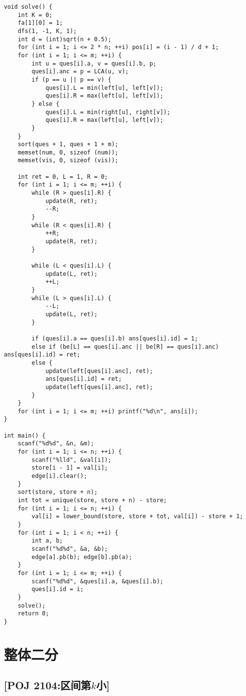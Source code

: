\begin{lstlisting}
void solve() {
    int K = 0;
    fa[1][0] = 1;
    dfs(1, -1, K, 1);
    int d = (int)sqrt(n + 0.5);
    for (int i = 1; i <= 2 * n; ++i) pos[i] = (i - 1) / d + 1;
    for (int i = 1; i <= m; ++i) {
        int u = ques[i].a, v = ques[i].b, p;
        ques[i].anc = p = LCA(u, v);
        if (p == u || p == v) {
            ques[i].L = min(left[u], left[v]);
            ques[i].R = max(left[u], left[v]);
        } else {
            ques[i].L = min(right[u], right[v]);
            ques[i].R = max(left[u], left[v]);
        }
    }
    sort(ques + 1, ques + 1 + m);
    memset(num, 0, sizeof (num));
    memset(vis, 0, sizeof (vis));

    int ret = 0, L = 1, R = 0;
    for (int i = 1; i <= m; ++i) {
        while (R > ques[i].R) {
            update(R, ret);
            --R;
        }
        while (R < ques[i].R) {
            ++R;
            update(R, ret);
        }

        while (L < ques[i].L) {
            update(L, ret);
            ++L;
        }
        while (L > ques[i].L) {
            --L;
            update(L, ret);
        }

        if (ques[i].a == ques[i].b) ans[ques[i].id] = 1;
        else if (be[L] == ques[i].anc || be[R] == ques[i].anc) ans[ques[i].id] = ret;
        else {
            update(left[ques[i].anc], ret);
            ans[ques[i].id] = ret;
            update(left[ques[i].anc], ret);
        }
    }
    for (int i = 1; i <= m; ++i) printf("%d\n", ans[i]);
}

int main() {
    scanf("%d%d", &n, &m);
    for (int i = 1; i <= n; ++i) {
        scanf("%lld", &val[i]);
        store[i - 1] = val[i];
        edge[i].clear();
    }
    sort(store, store + n);
    int tot = unique(store, store + n) - store;
    for (int i = 1; i <= n; ++i) {
        val[i] = lower_bound(store, store + tot, val[i]) - store + 1;
    }
    for (int i = 1; i < n; ++i) {
        int a, b;
        scanf("%d%d", &a, &b);
        edge[a].pb(b); edge[b].pb(a);
    }
    for (int i = 1; i <= m; ++i) {
        scanf("%d%d", &ques[i].a, &ques[i].b);
        ques[i].id = i;
    }
    solve();
    return 0;
}
\end{lstlisting}

\clearpage
\section{整体二分}

\subsection{[POJ 2104:区间第$k$小]}

